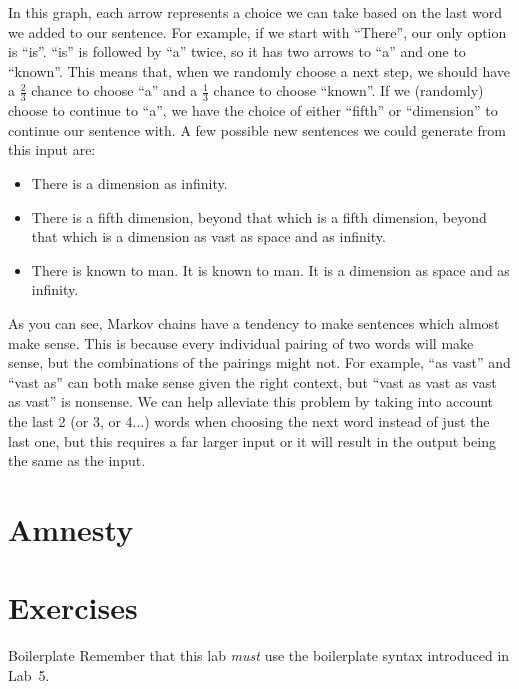 \documentclass[11pt]{cselabheader}
\begin{document}
In this graph, each arrow represents a choice we can take based on the last word we added to our sentence. For example, if we start with ``There'', our only option is ``is''. ``is'' is followed by ``a'' twice, so it has two arrows to ``a'' and one to ``known''. This means that, when we randomly choose a next step, we should have a $\frac{2}{3}$ chance to choose ``a'' and a $\frac{1}{3}$ chance to choose ``known''. If we (randomly) choose to continue to ``a'', we have the choice of either ``fifth'' or ``dimension'' to continue our sentence with. A few possible new sentences we could generate from this input are:
\begin{itemize}
\item There is a dimension as infinity.
\item There is a fifth dimension, beyond that which is a fifth dimension, beyond that which is a dimension as vast as space and as infinity.
\item There is known to man. It is known to man. It is a dimension as space and as infinity.
\end{itemize}

As you can see, Markov chains have a tendency to make sentences which almost make sense. This is because every individual pairing of two words will make sense, but the combinations of the pairings might not. For example, ``as vast'' and ``vast as'' can both make sense given the right context, but ``vast as vast as vast as vast'' is nonsense. We can help alleviate this problem by taking into account the last 2 (or 3, or 4...) words when choosing the next word instead of just the last one, but this requires a far larger input or it will result in the output being the same as the input.


\section{Amnesty}
\label{sec:amnesty}


\pagebreak

\section{Exercises}
\label{sec:ex}

\begin{warningbox}{Boilerplate}
  Remember that this lab \emph{must} use the
  boilerplate syntax introduced in Lab~5.
\end{warningbox}
\end{document}
